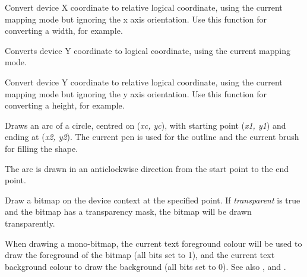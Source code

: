 \label{wxdcdevicetologicalxrel}


Convert device X coordinate to relative logical coordinate, using the current
mapping mode but ignoring the x axis orientation.
Use this function for converting a width, for example.


\label{wxdcdevicetologicaly}


Converts device Y coordinate to logical coordinate, using the current
mapping mode.


\label{wxdcdevicetologicalyrel}


Convert device Y coordinate to relative logical coordinate, using the current
mapping mode but ignoring the y axis orientation.
Use this function for converting a height, for example.


\label{wxdcdrawarc}


Draws an arc of a circle, centred on ({\it xc, yc}), with starting point ({\it x1, y1})
and ending at ({\it x2, y2}).   The current pen is used for the outline
and the current brush for filling the shape.

The arc is drawn in an anticlockwise direction from the start point to the end point.


\label{wxdcdrawbitmap}


Draw a bitmap on the device context at the specified point. If {\it transparent} is true and the bitmap has
a transparency mask, the bitmap will be drawn transparently.

When drawing a mono-bitmap, the current text foreground colour will be used to draw the foreground
of the bitmap (all bits set to 1), and the current text background colour to draw the background
(all bits set to 0). See also , 
 and .


